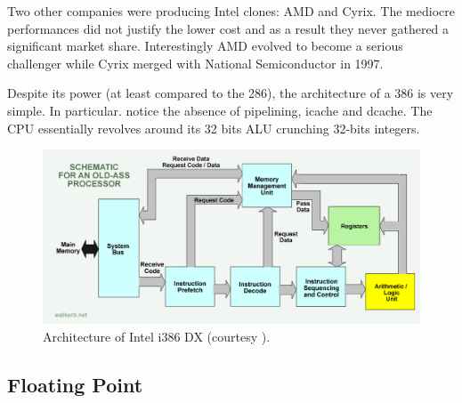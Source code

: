 \documentclass[book.tex]{subfiles}
\begin{document}
 \bigskip
 


\par

 Two other companies were producing Intel clones: AMD and Cyrix. The mediocre performances did not justify the lower cost and as a result they never gathered a significant market share. Interestingly AMD evolved to become a serious challenger while Cyrix merged with National Semiconductor in 1997.\\
\par
Despite its power (at least compared to the 286), the architecture of a 386 is very simple. In particular. notice the absence of pipelining, icache and dcache. The CPU essentially revolves around its 32 bits ALU crunching 32-bits integers.

\begin{figure}[H]
\centering
  
      \includegraphics[width=\textwidth]{imgs/drawings/80386DX_arch.png}
\caption{Architecture of Intel i386 DX (courtesy ).}
\end{figure}








  \subsection{Floating Point}
  
\end{document}
